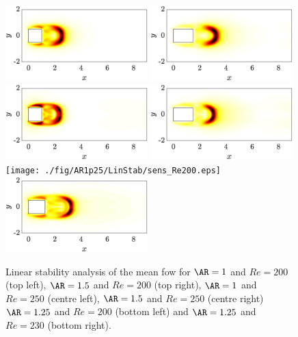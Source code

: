 \begin{figure}
  \centering
  \includegraphics[width=0.49\textwidth]{./fig/AR1/LinStab/sens_Re200.eps}
  \includegraphics[width=0.49\textwidth]{./fig/AR1p5/LinStab/sens_Re200.eps}
  \includegraphics[width=0.49\textwidth]{./fig/AR1/LinStab/sens_Re250.eps}
  \includegraphics[width=0.49\textwidth]{./fig/AR1p5/LinStab/sens_Re250.eps}
  \texttt{[image: ./fig/AR1p25/LinStab/sens\_Re200.eps]}
  \includegraphics[width=0.49\textwidth]{./fig/AR1p25/LinStab/sens_Re230.eps}
  \caption{Linear stability analysis of the mean fow for $\AR=1$ and $Re=200$ (top left), $\AR=1.5$ and $Re=200$ (top right), $\AR=1$ and $Re=250$ (centre left), $\AR=1.5$ and $Re=250$ (centre right) $\AR=1.25$ and $Re=200$ (bottom left) and $\AR=1.25$ and $Re=230$ (bottom right).}
  \label{fig:mf_sens}
\end{figure}
